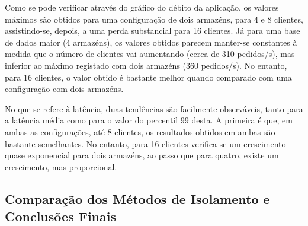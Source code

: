 Como se pode verificar através do gráfico do débito da aplicação, os valores máximos são obtidos para uma configuração de dois armazéns, para 4 e 8 clientes, assistindo-se, depois, a uma perda substancial para 16 clientes.
Já para uma base de dados maior (4 armazéns), os valores obtidos parecem manter-se constantes à medida que o número de clientes vai aumentando (cerca de 310 pedidos/s), mas inferior ao máximo registado com dois armazéns (360 pedidos/s).
No entanto, para 16 clientes, o valor obtido é bastante melhor quando comparado com uma configuração com dois armazéns.

No que se refere à latência, duas tendências são facilmente observáveis, tanto para a latência média como para o valor do percentil 99 desta.
A primeira é que, em ambas as configurações, até 8 clientes, os resultados obtidos em ambas são bastante semelhantes.
No entanto, para 16 clientes verifica-se um crescimento quase exponencial para dois armazéns, ao passo que para quatro, existe um crescimento, mas proporcional.

\newpage

\subsection{Comparação dos Métodos de Isolamento e  Conclusões Finais}

